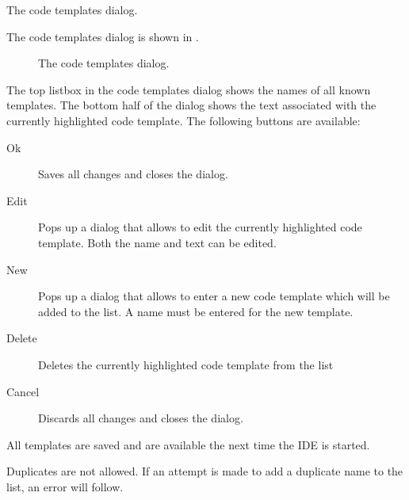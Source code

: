 \begin{htmlonly}
The code templates dialog.
\end{htmlonly}
\begin{latexonly}
The code templates dialog is shown in .
\begin{figure}[ht]
\begin{center}
\caption{The code templates dialog.}\label{fig:codetemp}
\ifpdf
{}
\else
{}
\fi
\end{center}
\end{figure}
\end{latexonly}
The top listbox in the code templates dialog shows the names of all 
known templates. The bottom half of the dialog shows the text associated
with the currently highlighted code template.
The following buttons are available:
\begin{description}
\item[Ok] Saves all changes and closes the dialog.
\item[Edit] Pops up a dialog that allows to edit the currently 
highlighted code template. Both the name and text can be edited.
\item[New] Pops up a dialog that allows to enter a new code template
which will be added to the list. A name must be entered for the new
template.
\item[Delete] Deletes the currently highlighted code template from the list
\item[Cancel] Discards all changes and closes the dialog.
\end{description}
All templates are saved and are available the next time the IDE is started.
\begin{remark}
Duplicates are not allowed. If an attempt is made to add a duplicate name
to the list, an error will follow.
\end{remark}

